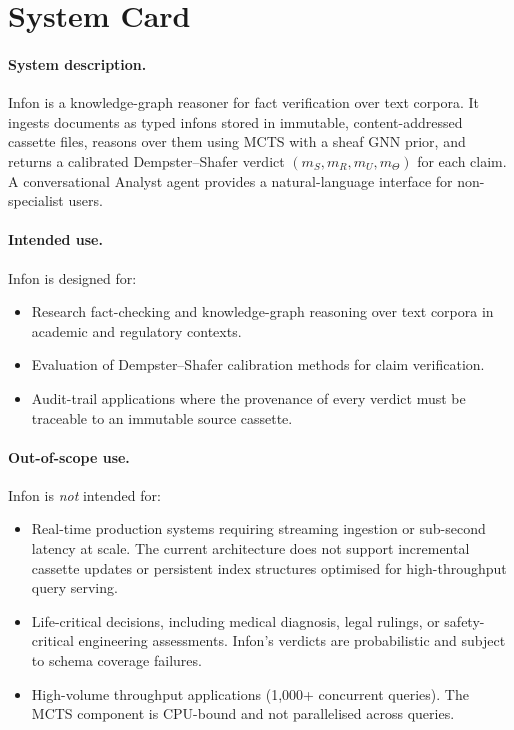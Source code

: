 \section{System Card}
\label{sec:system_card}

\paragraph{System description.}
Infon is a knowledge-graph reasoner for fact verification over text
corpora.  It ingests documents as typed infons stored in immutable,
content-addressed cassette files, reasons over them using MCTS with a sheaf
GNN prior, and returns a calibrated Dempster--Shafer verdict
$(m_S, m_R, m_U, m_\Theta)$ for each claim.  A conversational Analyst agent
provides a natural-language interface for non-specialist users.

\paragraph{Intended use.}
Infon is designed for:
\begin{itemize}
  \item Research fact-checking and knowledge-graph reasoning over text
    corpora in academic and regulatory contexts.
  \item Evaluation of Dempster--Shafer calibration methods for claim
    verification.
  \item Audit-trail applications where the provenance of every verdict must
    be traceable to an immutable source cassette.
\end{itemize}

\paragraph{Out-of-scope use.}
Infon is \emph{not} intended for:
\begin{itemize}
  \item Real-time production systems requiring streaming ingestion or
    sub-second latency at scale.  The current architecture does not support
    incremental cassette updates or persistent index structures optimised
    for high-throughput query serving.
  \item Life-critical decisions, including medical diagnosis, legal rulings,
    or safety-critical engineering assessments.  Infon's verdicts are
    probabilistic and subject to schema coverage failures.
  \item High-volume throughput applications (1,000+ concurrent queries).
    The MCTS component is CPU-bound and not parallelised across queries.
\end{itemize}

